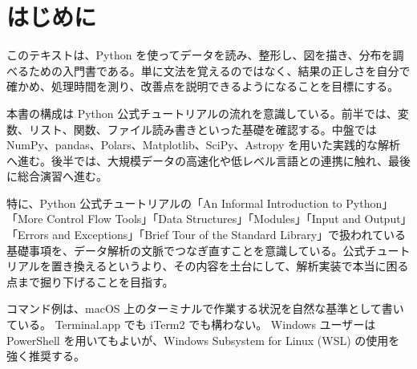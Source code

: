 \chapter*{はじめに}

このテキストは、Python を使ってデータを読み、整形し、図を描き、分布を調べるための入門書である。単に文法を覚えるのではなく、結果の正しさを自分で確かめ、処理時間を測り、改善点を説明できるようになることを目標にする。

本書の構成は Python 公式チュートリアルの流れを意識している。前半では、変数、リスト、関数、ファイル読み書きといった基礎を確認する。中盤では NumPy、pandas、Polars、Matplotlib、SciPy、Astropy を用いた実践的な解析へ進む。後半では、大規模データの高速化や低レベル言語との連携に触れ、最後に総合演習へ進む。

特に、Python 公式チュートリアルの「An Informal Introduction to Python」「More Control Flow Tools」「Data Structures」「Modules」「Input and Output」「Errors and Exceptions」「Brief Tour of the Standard Library」で扱われている基礎事項を、データ解析の文脈でつなぎ直すことを意識している。公式チュートリアルを置き換えるというより、その内容を土台にして、解析実装で本当に困る点まで掘り下げることを目指す。

コマンド例は、macOS 上のターミナルで作業する状況を自然な基準として書いている。
Terminal.app でも iTerm2 でも構わない。
Windows ユーザーは PowerShell を用いてもよいが、Windows Subsystem for Linux (WSL) の使用を強く推奨する。

